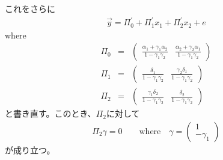 \documentclass[a4paper, 12pt]{ltjsarticle}
\begin{document}
これをさらに
\begin{align}
  \vec{y}=\Pi_0^{\prime}+\Pi_1^{\prime}x_1+\Pi_2^{\prime}x_2+e
\end{align}
where
\begin{eqnarray*}
  \Pi_0&=&\begin{pmatrix}
    \frac{\alpha_1+\gamma_1 \alpha_2}{1-\gamma_1 \gamma_2}&
    \frac{\alpha_2+\gamma_2 \alpha_1}{1-\gamma_1 \gamma_2}
  \end{pmatrix}\\
  \Pi_1&=&\begin{pmatrix}
    \frac{\delta_1}{1-\gamma_1 \gamma_2}&
    \frac{\gamma_2 \delta_1}{1-\gamma_1 \gamma_2}
  \end{pmatrix}\\
  \Pi_2&=&\begin{pmatrix}
    \frac{\gamma_1 \delta_2}{1-\gamma_1 \gamma_2}&
    \frac{\delta_2}{1-\gamma_1 \gamma_2}
  \end{pmatrix}
\end{eqnarray*}
と書き直す。このとき、$\Pi_2$に対して
\begin{align}
  \Pi_2\gamma=0\qquad\text{where}\quad\gamma=\begin{pmatrix}
    1\\
    -\gamma_1
  \end{pmatrix}
\end{align}
が成り立つ。
\end{document}
